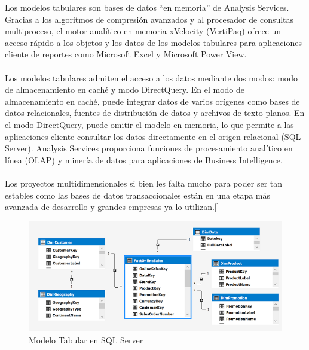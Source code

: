 \documentclass[11pt,a4paper]{article}
\begin{document}
	 	Los modelos tabulares son bases de datos “en memoria” de Analysis Services. Gracias a los algoritmos de compresión avanzados y al procesador de consultas multiproceso, el motor analítico en memoria xVelocity (VertiPaq) ofrece un acceso rápido a los objetos y los datos de los modelos tabulares para aplicaciones cliente de reportes como Microsoft Excel y Microsoft Power View.\\
	 	\\
	 	Los modelos tabulares admiten el acceso a los datos mediante dos modos: modo de almacenamiento en caché y modo DirectQuery. En el modo de almacenamiento en caché, puede integrar datos de varios orígenes como bases de datos relacionales, fuentes de distribución de datos y archivos de texto planos. En el modo DirectQuery, puede omitir el modelo en memoria, lo que permite a las aplicaciones cliente consultar los datos directamente en el origen relacional (SQL Server).
	 	Analysis Services proporciona funciones de procesamiento analítico en línea (OLAP) y minería de datos para aplicaciones de Business Intelligence.\\
	 	\\
	 	Los proyectos multidimensionales si bien les falta mucho para poder ser tan estables como las bases de datos transaccionales están en una etapa más avanzada de desarrollo y grandes empresas ya lo utilizan.[\cite{sanchez2015modelacion}]
	 	
	 	\begin{figure}[!ht]
	 		\begin{center}
	 			\includegraphics[scale=1.5]{./Imagenes/img01}	
	 			\caption{Modelo Tabular en SQL Server}		
	 		\end{center}
	 	\end{figure}
	 	
\end{document}
